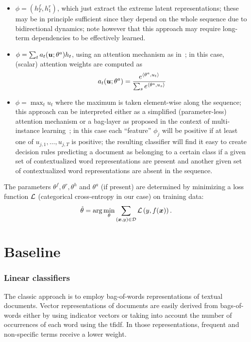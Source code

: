 \begin{itemize}
\item $\phi=(h^f_T,h^r_1)$, which just
  extract the extreme latent representations; these may be in
  principle sufficient since they depend on the whole sequence due to
  bidirectional dynamics; note however that this approach may require
  long-term dependencies to be effectively learned.
\item
  $\phi = \sum_t a_t(\bm{u};\theta^a) h_t$,
  using an attention mechanism as in~\cite{yang_hierarchical_2016}; in
  this case, (scalar) attention weights are computed as
  $$
  a_t(\bm{u};\theta^a) = \frac{e^{\langle \theta^a, u_t\rangle}}
  {\sum_s{e^{\langle \theta^a, u_s\rangle}}}
  $$
\item $\phi = \max_t u_t$ where the maximum is taken element-wise
  along the sequence; this approach can be interpreted either as a
  simplified (parameter-less) attention mechanism or a bag-layer as
  proposed in the context of multi-instance
  learning~\cite{tibo2017network}; in this case each ``feature''
  $\phi_j$ will be positive if at least one of $u_{j,1},\dots,u_{j,T}$
  is positive; the resulting classifier will find it easy to create
  decision rules predicting a document as belonging to a certain class
  if a given set of contextualized word representations are present
  and another given set of contextualized word representations are
  absent in the sequence.
\end{itemize}

The parameters $\theta^f,\theta^r,\theta^h$ and $\theta^a$ (if
present) are determined by minimizing a loss function $\mathcal{L}$
(categorical cross-entropy in our case) on training data:
\begin{equation}
  \hat \theta = \mathrm{arg}\min_\theta\sum_{(\bm{x},y)\in\mathcal{D}}\mathcal{L}\left(y,f(\bm{x})\right).
\end{equation}


\section{Baseline}

\subsubsection{Linear classifiers}
The classic approach is to employ bag-of-words
representations of textual documents.
Vector representations of documents are easily
derived from bags-of-words either by using indicator vectors or taking
into account the number of occurrences of each word using the
\ac{tfidf}\cite{manning_introduction_2008}. In those representations,
frequent and non-specific terms receive a lower weight.

